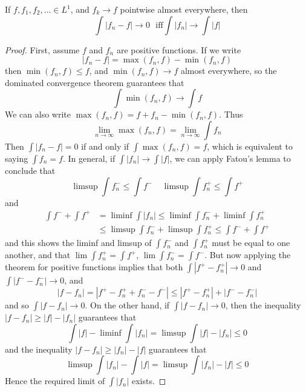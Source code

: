 \begin{lemma}[Scheffe]
    If $f, f_1, f_2, \dots \in L^1$, and $f_k \to f$ pointwise almost everywhere, then
    \[ \int |f_n - f| \to 0\ \ \ \text{iff} \int |f_n| \to \int |f| \]
\end{lemma}
\begin{proof}
    First, assume $f$ and $f_n$ are positive functions. If we write
    \[ |f_n - f| = \max(f_n,f) - \min(f_n,f) \]
    then $\min(f_n,f) \leq f$, and $\min(f_n,f) \to f$ almost everywhere, so the dominated convergence theorem guarantees that
    \[ \int \min(f_n,f) \to \int f \]
    We can also write $\max(f_n,f) = f + f_n - \min(f_n,f)$. Thus
    \[ \lim_{n \to \infty} \max(f_n,f) = \lim_{n \to \infty} \int f_n \]
    Then $\int |f_n - f| = 0$ if and only if $\int \max(f_n,f) = f$, which is equivalent to saying $\int f_n = f$. In general, if $\int |f_n| \to \int |f|$, we can apply Fatou's lemma to conclude that
    \[ \limsup \int f_n^- \leq \int f^-\ \ \ \ \ \limsup \int f_n^+ \leq \int f^+ \]
    and
    \begin{align*}
        \int f^- + \int f^+ &= \liminf \int |f_n| \leq \liminf \int f_n^- + \liminf \int f_n^+\\
        &\leq \limsup \int f_n^- + \limsup \int f_n^+ \leq \int f^- + \int f^+
    \end{align*}
    and this shows the liminf and limsup of $\int f_n^-$ and $\int f_n^+$ must be equal to one another, and that $\lim \int f_n^+ = \int f^+$, $\lim \int f_n^- = \int f^-$. But now applying the theorem for positive functions implies that both $\int |f^+ - f_n^+| \to 0$ and $\int |f^- - f_n^-| \to 0$, and
    \[ |f - f_n| = |f^+ - f_n^+ + f_n^- - f^-| \leq |f^+ - f_n^+| + |f^- - f_n^-| \]
    and so $\int |f - f_n| \to 0$. On the other hand, if $\int |f - f_n| \to 0$, then the inequality $|f - f_n| \geq |f| - |f_n|$ guarantees that
    \[ \int |f| - \liminf \int |f_n| = \limsup \int |f| - |f_n| \leq 0 \]
    and the inequality $|f - f_n| \geq |f_n| - |f|$ guarantees that
    \[ \limsup \int |f_n| - \int |f| = \limsup \int |f_n| - |f| \leq 0 \]
    Hence the required limit of $\int |f_n|$ exists.
\end{proof}

